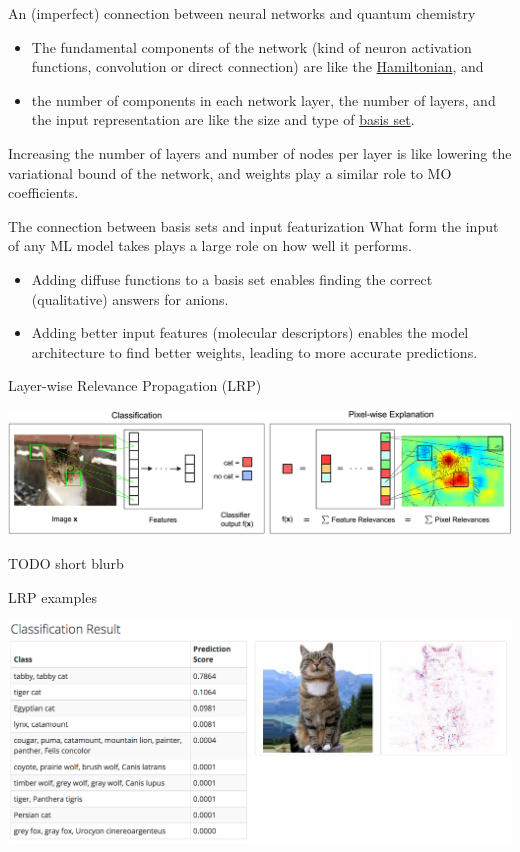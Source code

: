 \documentclass[xetex,compress]{beamer}
\begin{document}
\begin{frame}{An (imperfect) connection between neural networks and quantum chemistry}
  \begin{itemize}
  \item The fundamental components of the network (kind of neuron activation functions, convolution or direct connection) are like the \underline{Hamiltonian}, and
  \item the number of components in each network layer, the number of layers, and the input representation are like the size and type of \underline{basis set}.
  \end{itemize}
  Increasing the number of layers and number of nodes per layer is like lowering the variational bound of the network, and weights play a similar role to MO coefficients.
\end{frame}

\begin{frame}{The connection between basis sets and input featurization}
  What form the input of any ML model takes plays a large role on how well it performs.
  \begin{itemize}
  \item Adding diffuse functions to a basis set enables finding the correct (qualitative) answers for anions.
  \item Adding better input features (molecular descriptors) enables the model architecture to find better weights, leading to more accurate predictions.
  \end{itemize}
\end{frame}

\begin{frame}{Layer-wise Relevance Propagation (LRP)}
  \begin{center}
    \includegraphics[width=1.00\textwidth]{./figures/2-Figure1-1.png}
  \end{center}
  TODO short blurb
\end{frame}

\begin{frame}{LRP examples}
  \begin{center}
    \includegraphics[width=1.00\textwidth]{./figures/lrp_example_1.png}
  \end{center}
\end{frame}
\end{document}
